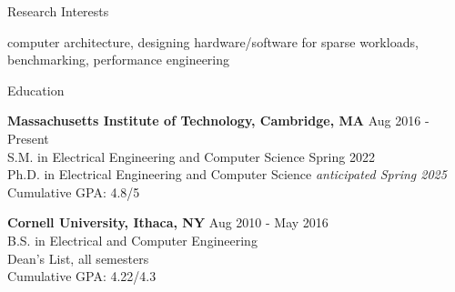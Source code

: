 \documentclass{resume} %
\begin{document}

\begin{rSection}{Research Interests}

computer architecture, designing hardware/software for sparse workloads, benchmarking, performance engineering

\end{rSection}


\begin{rSection}{Education}

{\bf Massachusetts Institute of Technology, Cambridge, MA} \hfill { Aug 2016 - Present} \\ 
S.M. in Electrical Engineering and Computer Science \hfill {Spring 2022} \\
Ph.D. in Electrical Engineering and Computer Science \hfill { \it{anticipated} Spring 2025} \\
Cumulative GPA: 4.8/5

{\bf Cornell University, Ithaca, NY} \hfill { Aug 2010 - May 2016} \\ 
B.S. in Electrical and Computer Engineering \\
Dean's List, all semesters \\
Cumulative GPA: 4.22/4.3 

\end{rSection}

\end{document}
